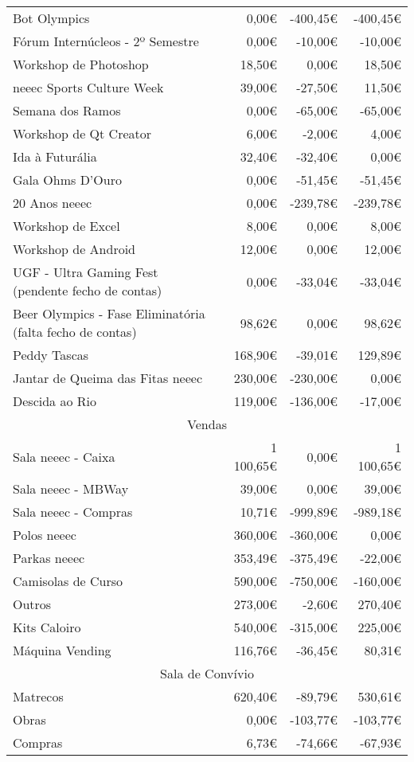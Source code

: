 \begin{longtable}{Xrrr}
Bot Olympics & 0,00€ & -400,45€ & -400,45€ \\
Fórum Internúcleos - 2º Semestre & 0,00€ & -10,00€ & -10,00€ \\
Workshop de Photoshop & 18,50€ & 0,00€ & 18,50€ \\
\acrshort{neeec} Sports Culture Week & 39,00€ & -27,50€ & 11,50€ \\
Semana dos Ramos & 0,00€ & -65,00€ & -65,00€ \\
Workshop de Qt Creator & 6,00€ & -2,00€ & 4,00€ \\
Ida à Futurália & 32,40€ & -32,40€ & 0,00€ \\
Gala Ohms D'Ouro & 0,00€ & -51,45€ & -51,45€ \\
20 Anos \acrshort{neeec} & 0,00€ & -239,78€ & -239,78€ \\
Workshop de Excel & 8,00€ & 0,00€ & 8,00€ \\
Workshop de Android & 12,00€ & 0,00€ & 12,00€ \\
UGF - Ultra Gaming Fest (pendente fecho de contas) & 0,00€ & -33,04€ & -33,04€ \\
Beer Olympics - Fase Eliminatória (falta fecho de contas) & 98,62€ & 0,00€ & 98,62€ \\
Peddy Tascas & 168,90€ & -39,01€ & 129,89€ \\
Jantar de Queima das Fitas \acrshort{neeec} & 230,00€ & -230,00€ & 0,00€ \\
Descida ao Rio & 119,00€ & -136,00€ & -17,00€ \\

\hline
\multicolumn{4}{c}{Vendas} \\
\hline
Sala \acrshort{neeec} - Caixa & 1 100,65€ & 0,00€ & 1 100,65€ \\
Sala \acrshort{neeec} - MBWay & 39,00€ & 0,00€ & 39,00€ \\
Sala \acrshort{neeec} - Compras & 10,71€\footnotemark & -999,89€ & -989,18€ \\
Polos \acrshort{neeec} & 360,00€ & -360,00€ & 0,00€ \\
Parkas \acrshort{neeec} & 353,49€ & -375,49€ & -22,00€ \\
Camisolas de Curso & 590,00€ & -750,00€ & -160,00€ \\
Outros & 273,00€ & -2,60€ & 270,40€ \\
Kits Caloiro & 540,00€ & -315,00€ & 225,00€ \\
Máquina Vending & 116,76€ & -36,45€ & 80,31€ \\

\hline
\multicolumn{4}{c}{Sala de Convívio} \\
\hline
Matrecos & 620,40€ & -89,79€ & 530,61€ \\
Obras & 0,00€ & -103,77€ & -103,77€ \\
Compras & 6,73€ & -74,66€ & -67,93€ \\


\end{longtable}
